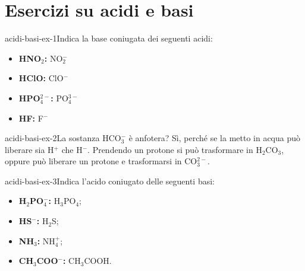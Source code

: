 \documentclass[preview]{standalone}
\begin{document}
\genpage

\section{Esercizi su acidi e basi}

\begin{snippetexercise}{acidi-basi-ex-1}{Indica la base coniugata dei seguenti acidi:}
    \begin{itemize}
        \item \textbf{HNO\(_2\):} NO\({}_2^-\)
        \item \textbf{HClO:} ClO\({}^-\)
        \item \textbf{HPO\(_4^{2-}\):} PO\({}_4^{3-}\)
        \item \textbf{HF:} F\(^-\)
    \end{itemize}
\end{snippetexercise}

\begin{snippetexercise}{acidi-basi-ex-2}{La sostanza HCO\(_3^-\) è anfotera?}
    Sì, perché se la metto in acqua può liberare sia H\({}^+\) che H\({}^-\).
    Prendendo un protone si può trasformare in H\({}_2\)CO\({}_3\),
    oppure può liberare un protone e trasformarsi in CO\({}_3^{2-}\).
\end{snippetexercise}


\begin{snippetexercise}{acidi-basi-ex-3}{Indica l'acido coniugato delle seguenti basi:}
    \begin{itemize}
        \item \textbf{H\({}_2\)PO\({}_4^-\):} H\(_3\)PO\(_4\);
        \item \textbf{HS\({}^-\):} H\(_2\)S;
        \item \textbf{NH\({}_3\):} NH\(_4^+\);
        \item \textbf{CH\({}_3\)COO\({}^-\):} CH\(_3\)COOH.
    \end{itemize}
\end{snippetexercise}
\end{document}
